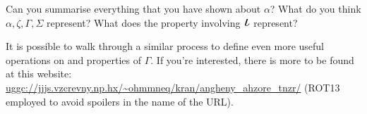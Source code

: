 \begin{enumerate}
  Can you summarise everything that you have shown about \(\alpha\)? What do
  you think \(\alpha, \zeta, \Gamma, \Sigma\) represent? What does the property
  involving \(\BigIota\) represent?

  It is possible to walk through a similar process to define even more useful
  operations on and properties of \(\Gamma\). If you're interested, there is
  more to be found at this website:\\
  \url{uggc://jjjs.vzcrevny.np.hx/~ohmmneq/kran/angheny_ahzore_tnzr/} (ROT13
  employed to avoid spoilers in the name of the URL).
\end{enumerate}

